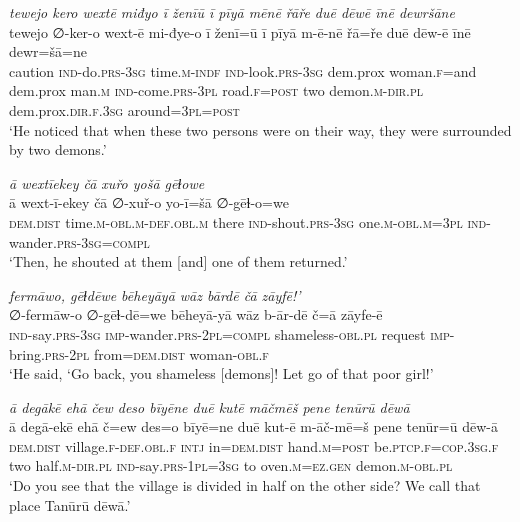 \ea \label{ZP.67}
\textit{tewejo kero wextē miđyo ī ženīū ī pīyā mēnē řāře duē dēwē īnē dewršāne} \\ 
\gll tewejo ∅-ker-o wext-ē mi-đye-o ī ženī=ū ī pīyā m-ē-nē řā=ře duē dēw-ē īnē dewr=šā=ne \\ 
 caution \textsc{ind-}do\textsc{.prs}\textsc{-3sg} time\textsc{.m}\textsc{-indf} \textsc{ind-}look\textsc{.prs}\textsc{-3sg} dem.prox woman\textsc{.f}=and dem.prox man\textsc{.m} \textsc{ind-}come\textsc{.prs}\textsc{-3pl} road\textsc{.f}\textsc{=\textsc{post}} two demon\textsc{.m}\textsc{-dir}\textsc{.pl} dem.prox\textsc{.dir}\textsc{.f}\textsc{.3sg} around\textsc{=3pl}\textsc{=\textsc{post}} \\ 
\glt `He noticed that when these two persons were on their way, they were surrounded by two demons.'
\z 
 
\ea \label{ZP.68}
\textit{ā wextīekey čā xuřo yošā gēɫowe} \\ 
\gll ā wext-ī-ekey čā ∅-xuř-o yo-ī=šā ∅-gēɫ-o=we \\ 
 \textsc{dem.dist} time\textsc{.m}\textsc{-obl}\textsc{.m}\textsc{-def}\textsc{.obl}\textsc{.m} there \textsc{ind-}shout\textsc{.prs}\textsc{-3sg} one\textsc{.m}\textsc{-obl}\textsc{.m}\textsc{=3pl} \textsc{ind-}wander\textsc{.prs}\textsc{-3sg}\textsc{=compl} \\ 
\glt `Then, he shouted at them [and] one of them returned.'
\z 
 
\ea \label{ZP.70}
\textit{fermāwo, gēɫdēwe bēheyāyā wāz bārdē čā zāyfē!’} \\ 
\gll ∅-fermāw-o ∅-gēɫ-dē=we bēheyā-yā wāz b-ār-dē č=ā zāyfe-ē \\ 
 \textsc{ind-}say\textsc{.prs}\textsc{-3sg} \textsc{imp-}wander\textsc{.prs}-\textsc{2pl}\textsc{=compl} shameless\textsc{-obl}\textsc{.pl} request \textsc{imp-}bring\textsc{.prs}-\textsc{2pl} from=\textsc{dem.dist} woman\textsc{-obl}\textsc{.f} \\ 
\glt `He said, ‘Go back, you shameless [demons]! Let go of that poor girl!'
\z 
 
\ea \label{ZP.74}
\textit{ā degākē ehā čew deso bīyēne duē kutē māčmēš pene tenūrū dēwā} \\ 
\gll ā degā-ekē ehā č=ew des=o bīyē=ne duē kut-ē m-āč-mē=š pene tenūr=ū dēw-ā \\ 
 \textsc{dem.dist} village\textsc{.f}\textsc{-def}\textsc{.obl}\textsc{.f} \textsc{intj} in=\textsc{dem.dist} hand\textsc{.m}\textsc{=\textsc{post}} be\textsc{.ptcp}\textsc{.f}\textsc{=cop}\textsc{.3sg}\textsc{.f} two half\textsc{.m}\textsc{-dir}\textsc{.pl} \textsc{ind-}say\textsc{.prs}\textsc{-1pl}\textsc{=3sg} to oven\textsc{.m}\textsc{\textsc{=ez.gen}} demon\textsc{.m}\textsc{-obl}\textsc{.pl} \\ 
\glt `Do you see that the village is divided in half on the other side? We call that place Tanūrū dēwā.'
\z 
 
